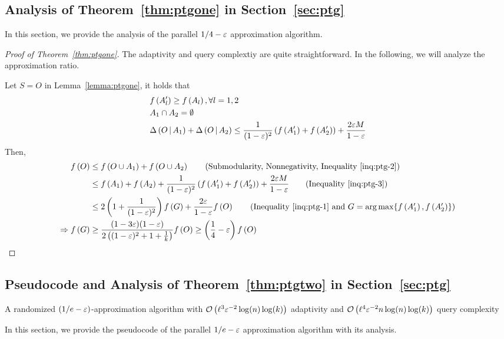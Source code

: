 \subsection{Analysis of Theorem~\ref{thm:ptgone} in Section~\ref{sec:ptg}}
\label{apx:ptgone-guarantee}
In this section, we provide the analysis of the parallel $1/4-\varepsilon$ approximation algorithm.
\thmptgone*
\begin{proof}[Proof of Theorem~\ref{thm:ptgone}]
The adaptivity and query complextiy are quite straightforward.
In the following, we will analyze the approximation ratio.

Let $S = O$ in Lemma~\ref{lemma:ptgone},
it holds that
\begin{align}
	& f \left( A_l' \right) \ge f \left( A_l \right), \forall l = 1,2 \label{inq:ptg-1}\\
	& A_1 \cap A_2 = \emptyset \label{inq:ptg-2}\\
	& \Delta \left( O \, \middle| \, A_1 \right) + \Delta \left( O \, \middle| \, A_2 \right) \le \frac{1}{(1-\varepsilon)^2}\left(f \left( A_1' \right) + f \left( A_2' \right) \right) + \frac{2\varepsilon M}{1-\varepsilon}\label{inq:ptg-3}
\end{align}
Then,
\begin{align*}
	\ff{O} &\le \ff{O\cup A_1} + \ff{O\cup A_2} \tag{Submodularity, Nonnegativity, Inequality~\eqref{inq:ptg-2}} \\
	&\le \ff{A_1} + \ff{A_2} + \frac{1}{(1-\epsi)^2}\left(\ff{A_1'} + \ff{A_2'} \right) + \frac{2\epsi M}{1-\epsi} \tag{Inequality~\eqref{inq:ptg-3}}\\
	&\le 2\left(1+\frac{1}{(1-\epsi)^2}\right)\ff{G} + \frac{2\epsi}{1-\epsi}\ff{O} \tag{Inequality~\eqref{inq:ptg-1} and $G = \argmax\{\ff{A_1'}, \ff{A_2'}\}$}\\
	\Rightarrow \ff{G} &\ge \frac{(1-3\epsi)(1-\epsi)}{2\left((1-\epsi)^2 + 1+\frac{1}{k}\right)}\ff{O}\ge \left(\frac{1}{4}-\epsi\right)\ff{O} 
\end{align*}
\end{proof}

\subsection{Pseudocode and Analysis of Theorem~\ref{thm:ptgtwo} in Section~\ref{sec:ptg}}
\label{apx:ptgtwo}
\begin{algorithm}[ht]
\caption{A randomized $(1/e-\varepsilon)$-approximation algorithm with $\mathcal O \left( \ell^{3}\varepsilon^{-2}\log(n)\log(k) \right)$ adaptivity and $\mathcal O \left( \ell^4\varepsilon^{-2}n\log(n)\log(k) \right)$ query complexity}\label{alg:ptg}
\label{alg:ptgtwo}
\end{algorithm}
In this section, we provide the pseudocode of the parallel $1/e-\varepsilon$ approximation algorithm with its analysis.

